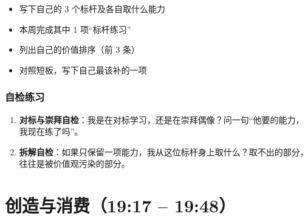 \begin{itemize}
\tightlist
\item[$\square$]
  写下自己的 3 个标杆及各自取什么能力
\item[$\square$]
  本周完成其中 1 项``标杆练习''
\item[$\square$]
  列出自己的价值排序（前 3 条）
\item[$\square$]
  对照短板，写下自己最该补的一项
\end{itemize}

\subsubsection{自检练习}

\begin{enumerate}
\def\labelenumi{\arabic{enumi}.}
\tightlist
\item
  \textbf{对标与崇拜自检}：我是在对标学习，还是在崇拜偶像？问一句``他要的能力，我现在练了吗''。
\item
  \textbf{拆解自检}：如果只保留一项能力，我从这位标杆身上取什么？取不出的部分，往往是被价值观污染的部分。
\end{enumerate}

\section{创造与消费（19:17 --
19:48）}

